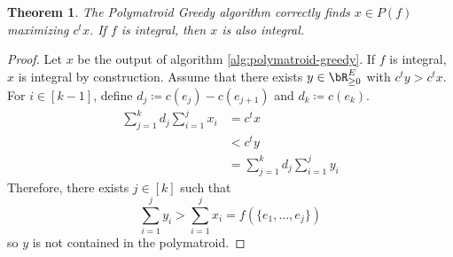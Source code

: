 \documentclass[11pt, a4paper]{article}
\newcommand{\set}[1]{\{#1\}}
\newtheorem{theorem}{Theorem}[section]
\theoremstyle{remark}
\theoremstyle{definition}
\begin{document}
\begin{theorem}
	The Polymatroid Greedy algorithm correctly finds $x\in P(f)$ maximizing $c^tx$.
	If $f$ is integral, then $x$ is also integral.
\end{theorem}
\begin{proof}
	Let $x$ be the output of algorithm \ref{alg:polymatroid-greedy}. If $f$
	is integral, $x$ is integral by construction. Assume that there exists
	$y\in \bR^{E}_{\geq0}$ with $c^ty>c^tx$. For $i\in
		[k-1]$, define $d_j\coloneqq c(e_j)-c(e_{j+1})$ and $d_k\coloneqq c(e_k)$.
	\begin{align*}
		\sum_{j=1}^kd_j\sum_{i=1}^jx_i & =c^tx                           \\
		                               & <c^ty                           \\
		                               & =\sum_{j=1}^kd_j\sum_{i=1}^jy_i
	\end{align*}
	Therefore, there exists $j\in [k]$ such that
	\[\sum_{i=1}^jy_i>\sum_{i=1}^j x_i=f(\set{e_1,\ldots,e_j})\]
	so $y$ is not contained in the polymatroid.
\end{proof}
\end{document}

